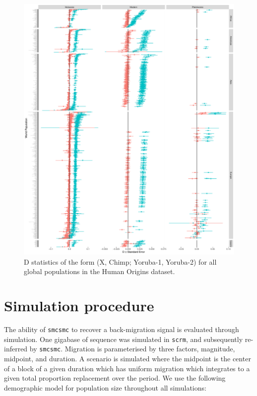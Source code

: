 \documentclass{article}
\begin{document}
\begin{figure}
	\centering
	\includegraphics[width=\textwidth]{../plot/yri_d_stats.pdf}
	\caption{D statistics of the form (X, Chimp; Yoruba-1, Yoruba-2) for all global populations in the Human Origins dataset.}
	\label{fig:alld}
\end{figure}

\clearpage

\section{Simulation procedure} \label{simproc}

The ability of {\tt smcsmc} to recover a back-migration signal is evaluated through simulation. One gigabase of sequence was simulated in {\tt scrm}, and subsequently re-inferred by {\tt smcsmc}. Migration is parameterised by three factors, magnitude, midpoint, and duration. A scenario is simulated where the midpoint is the center of a block of a given duration which has uniform migration which integrates to a given total proportion replacement over the period. We use the following demographic model for population size throughout all simulations:
\end{document}
